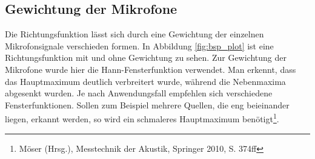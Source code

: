 \subsection{Gewichtung der Mikrofone}

	Die Richtungsfunktion lässt sich durch eine Gewichtung der einzelnen Mikrofonsignale verschieden formen. In Abbildung \ref{fig:bsp_plot} ist eine Richtungsfunktion mit und ohne Gewichtung zu sehen.
	Zur Gewichtung der Mikrofone wurde hier die Hann-Fensterfunktion verwendet.
	Man erkennt, dass das Hauptmaximum deutlich verbreitert wurde, während die Nebenmaxima abgesenkt wurden.
	Je nach Anwendungsfall empfehlen sich verschiedene Fensterfunktionen. Sollen zum Beispiel mehrere Quellen, die eng beieinander liegen, erkannt werden, so wird ein schmaleres Hauptmaximum benötigt\footnote{Möser (Hrsg.), Messtechnik der Akustik, Springer 2010, S. 374ff}.